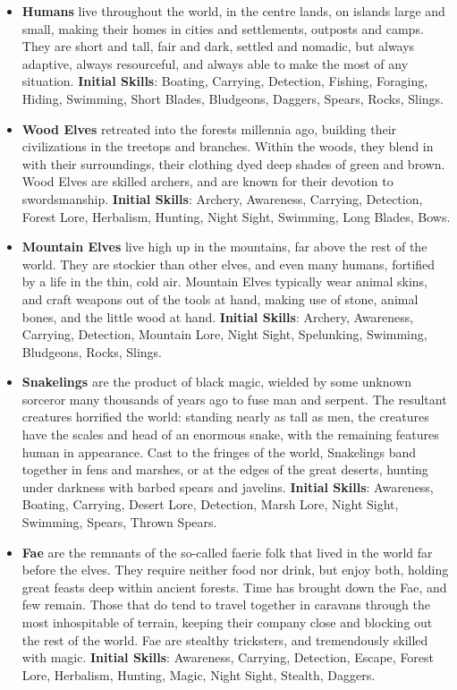 \begin{itemize}
\item {\bf Humans} live throughout the world, in the centre lands, on
islands large and small, making their homes in cities and settlements, 
outposts and camps.  They are short and tall, fair and dark, settled and 
nomadic, but always adaptive, always resourceful, and always able to make 
the most of any situation. \textbf{Initial Skills}: Boating, Carrying,
Detection, Fishing, Foraging, Hiding, Swimming, Short Blades, Bludgeons,
Daggers, Spears, Rocks, Slings.

\item {\bf Wood Elves} retreated into the forests millennia ago, building 
their civilizations in the treetops and branches.  Within the woods, they 
blend in with their surroundings, their clothing dyed deep shades of green 
and brown.  Wood Elves are skilled archers, and are known for their 
devotion to swordsmanship. \textbf{Initial Skills}: Archery, Awareness,
Carrying, Detection, Forest Lore, Herbalism, Hunting, Night Sight, Swimming,
Long Blades, Bows.

\item {\bf Mountain Elves} live high up in the mountains, far above the 
rest of the world.  They are stockier than other elves, and even many 
humans, fortified by a life in the thin, cold air.  Mountain Elves 
typically wear animal skins, and craft weapons out of the tools at hand, 
making use of stone, animal bones, and the little wood at hand.
\textbf{Initial Skills}: Archery, Awareness, Carrying, Detection, 
Mountain Lore, Night Sight, Spelunking, Swimming,
Bludgeons, Rocks, Slings.

\item {\bf Snakelings} are the product of black magic, wielded by some
unknown sorceror many thousands of years ago to fuse man and serpent. 
The resultant creatures horrified the world: standing nearly as tall as men,
the creatures have the scales and head of an enormous snake, with the 
remaining features human in appearance.  Cast to the fringes of the world, 
Snakelings band together in fens and marshes, or at the edges of the great
deserts, hunting under darkness with barbed spears and javelins.  
\textbf{Initial Skills}: Awareness, Boating, Carrying, Desert Lore, Detection,
Marsh Lore, Night Sight, Swimming, Spears, Thrown Spears.

\item {\bf Fae} are the remnants of the so-called faerie folk that lived in
the world far before the elves.  They require neither food nor drink, but 
enjoy both, holding great feasts deep within ancient forests.  Time has 
brought down the Fae, and few remain.  Those that do tend to travel 
together in caravans through the most inhospitable of terrain, keeping 
their company close and blocking out the rest of the world.  Fae are 
stealthy tricksters, and tremendously skilled with magic. 
\textbf{Initial Skills}: Awareness, Carrying, Detection, Escape, Forest
Lore, Herbalism, Hunting, Magic, Night Sight, Stealth, Daggers.


\end{itemize}
